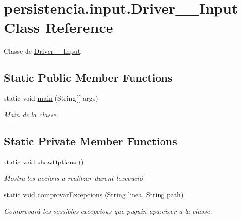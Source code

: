 \hypertarget{classpersistencia_1_1input_1_1Driver____Input}{}\section{persistencia.\+input.\+Driver\+\_\+\+\_\+\+Input Class Reference}
\label{classpersistencia_1_1input_1_1Driver____Input}


Classe de \hyperlink{classpersistencia_1_1input_1_1Driver____Input}{Driver\+\_\+\+\_\+\+Input}.  


\subsection*{Static Public Member Functions}
\begin{DoxyCompactItemize}
\item 
static void \hyperlink{classpersistencia_1_1input_1_1Driver____Input_a6a020d74862cb62628ab644253271179}{main} (String\mbox{[}$\,$\mbox{]} args)
\begin{DoxyCompactList}\small\item\em \hyperlink{classMain}{Main} de la classe. \end{DoxyCompactList}\end{DoxyCompactItemize}
\subsection*{Static Private Member Functions}
\begin{DoxyCompactItemize}
\item 
static void \hyperlink{classpersistencia_1_1input_1_1Driver____Input_a4f8a0f13847071d675771817ee212f2c}{show\+Options} ()
\begin{DoxyCompactList}\small\item\em Mostra les accions a realitzar durant l\textquotesingle{}execució \end{DoxyCompactList}\item 
static void \hyperlink{classpersistencia_1_1input_1_1Driver____Input_a0d86ebc99984018efe2b52c6f97de708}{comprovar\+Excepcions} (String linea, String path)
\begin{DoxyCompactList}\small\item\em Comprovarà les possibles excepcions que puguin apareixer a la classe. \end{DoxyCompactList}\end{DoxyCompactItemize}


